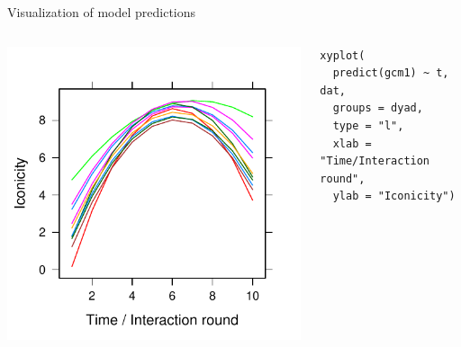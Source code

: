 \documentclass[aspectratio=169]{beamer}
\begin{document}
\begin{frame}[fragile]{Visualization of model predictions}
  \begin{columns}
    \begin{column}{.5\textwidth}
      \includegraphics[scale=.8]{../figures/icon-pre}
    \end{column}
    \begin{column}{.5\textwidth}
      \begin{lstlisting}
xyplot(
  predict(gcm1) ~ t, dat,
  groups = dyad,
  type = "l",
  xlab = "Time/Interaction round",
  ylab = "Iconicity")
      \end{lstlisting}
    \end{column}
  \end{columns}
\end{frame}

% 
\end{document}
